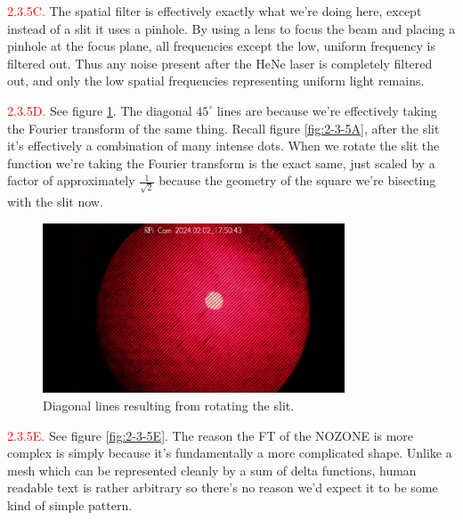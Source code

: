 \documentclass[letterpaper, reqno,11pt]{article}
\begin{document}
\noindent \textcolor{red}{2.3.5C.} The spatial filter is effectively exactly what we're doing here, except instead of a slit it uses a pinhole. By using a lens to focus the beam and placing a pinhole at the focus plane, all frequencies except the low, uniform frequency is filtered out. Thus any noise present after the HeNe laser is completely filtered out, and only the low spatial frequencies representing uniform light remains.

\noindent \textcolor{red}{2.3.5D.} See figure \ref{fig:2-3-5D}. The diagonal $45^{\circ}$ lines are because we're effectively taking the Fourier transform of the same thing. Recall figure \ref{fig:2-3-5A}, after the slit it's effectively a combination of many intense dots. When we rotate the slit the function we're taking the Fourier transform is the exact same, just scaled by a factor of approximately $\frac{1}{\sqrt{2}}$ because the geometry of the square we're bisecting with the slit now.

\begin{figure}[tb]
    \centering
    \includegraphics[width=0.8\textwidth]{Fourier/5d/media/im_0208_20240202_175043.jpg}
    \caption{Diagonal lines resulting from rotating the slit.}
    \label{fig:2-3-5D}
\end{figure}

\noindent \textcolor{red}{2.3.5E.} See figure \ref{fig:2-3-5E}. The reason the FT of the NOZONE is more complex is simply because it's fundamentally a more complicated shape. Unlike a mesh which can be represented cleanly by a sum of delta functions, human readable text is rather arbitrary so there's no reason we'd expect it to be some kind of simple pattern.
\end{document}
